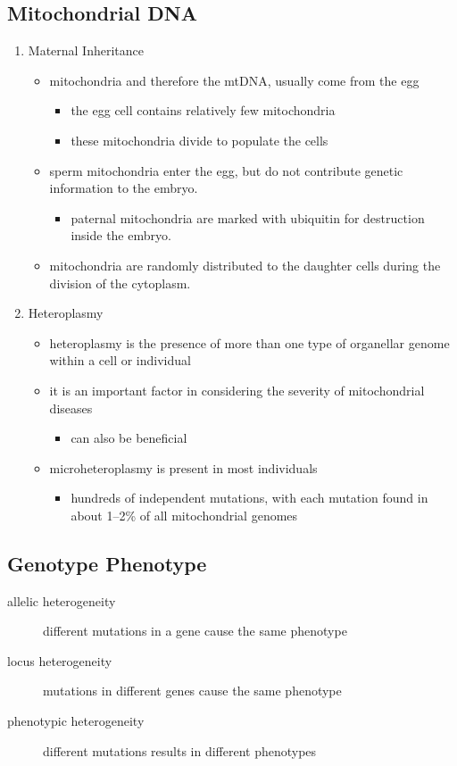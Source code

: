 \documentclass[12pt]{scrartcl}
\begin{document}
\subsection{Mitochondrial DNA}
\label{sec:orged489a9}
\begin{enumerate}
\item Maternal Inheritance
\label{sec:orge1536f0}
\begin{itemize}
\item mitochondria and therefore the mtDNA, usually come from the egg
\begin{itemize}
\item the egg cell contains relatively few mitochondria
\item these mitochondria divide to populate the cells
\end{itemize}
\item sperm mitochondria enter the egg, but do not contribute genetic
information to the embryo.
\begin{itemize}
\item paternal mitochondria are marked with ubiquitin for destruction
inside the embryo.
\end{itemize}
\item mitochondria are randomly distributed to the daughter cells during
the division of the cytoplasm.
\end{itemize}


\item Heteroplasmy
\label{sec:org2f0d15b}
\begin{itemize}
\item heteroplasmy is the presence of more than one type of organellar
genome within a cell or individual
\item it is an important factor in considering the severity of
mitochondrial diseases
\begin{itemize}
\item can also be beneficial
\end{itemize}
\item microheteroplasmy is present in most individuals
\begin{itemize}
\item hundreds of independent mutations, with each mutation found in
about 1–2\% of all mitochondrial genomes
\end{itemize}
\end{itemize}
\end{enumerate}
\subsection{Genotype Phenotype}
\label{sec:org0eb8faa}
\begin{description}
\item[{allelic heterogeneity}] different mutations in a gene cause the same phenotype
\item[{locus heterogeneity}] mutations in different genes cause the same phenotype
\item[{phenotypic heterogeneity}] different mutations results in different phenotypes
\end{description}
\end{document}
